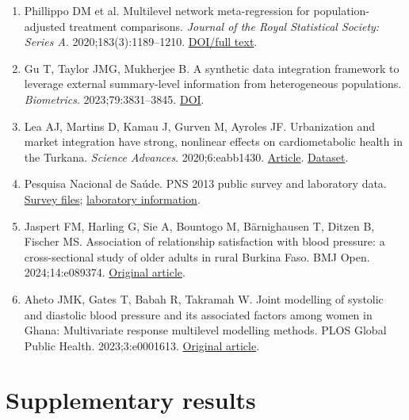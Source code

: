 \documentclass[11pt,letterpaper]{article}
\begin{document}
\begin{enumerate}[label=\arabic*.,leftmargin=2.1em,itemsep=.2em,parsep=0pt]
\item Phillippo DM et al. Multilevel network meta-regression for population-adjusted treatment comparisons. \emph{Journal of the Royal Statistical Society: Series A}. 2020;183(3):1189–\allowbreak{}1210. \href{https://rss.onlinelibrary.wiley.com/doi/full/10.1111/rssa.12579}{DOI/\allowbreak{}full text}.

\item Gu T, Taylor JMG, Mukherjee B. A synthetic data integration framework to leverage external summary-level information from heterogeneous populations. \emph{Biometrics}. 2023;79:3831–\allowbreak{}3845. \href{https://doi.org/10.1111/biom.13852}{DOI}.

\item Lea AJ, Martins D, Kamau J, Gurven M, Ayroles JF. Urbanization and market integration have strong, nonlinear effects on cardiometabolic health in the Turkana. \emph{Science Advances}. 2020;6:eabb1430. \href{https://doi.org/10.1126/sciadv.abb1430}{Article}. \href{https://doi.org/10.5061/dryad.2z34tmpjk}{Dataset}.

\item Pesquisa Nacional de Saúde. PNS 2013 public survey and laboratory data. \href{https://www.pns.icict.fiocruz.br/bases-de-dados/}{Survey files}; \href{https://www.pns.icict.fiocruz.br/exames-laboratoriais/}{laboratory information}.

\item Jaspert FM, Harling G, Sie A, Bountogo M, Bärnighausen T, Ditzen B, Fischer MS. Association of relationship satisfaction with blood pressure: a cross-sectional study of older adults in rural Burkina Faso. BMJ Open. 2024;14:e089374. \href{https://doi.org/10.1136/bmjopen-2024-089374}{Original article}.

\item Aheto JMK, Gates T, Babah R, Takramah W. Joint modelling of systolic and diastolic blood pressure and its associated factors among women in Ghana: Multivariate response multilevel modelling methods. PLOS Global Public Health. 2023;3:e0001613. \href{https://pmc.ncbi.nlm.nih.gov/articles/PMC10132648/}{Original article}.

\end{enumerate}

\endgroup

\clearpage

\appendix

\section*{Supplementary results}
\end{document}
